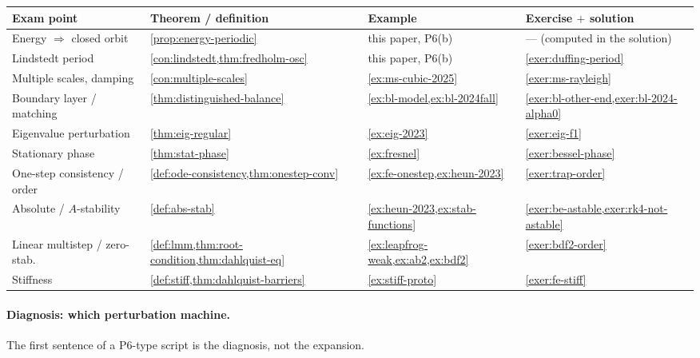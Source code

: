 \documentclass[11pt,a4paper]{article}
\begin{document}
{\footnotesize
\begin{center}
\begin{tabular}{@{}>{\raggedright\arraybackslash}p{3.3cm}
                   >{\raggedright\arraybackslash}p{3.7cm}
                   >{\raggedright\arraybackslash}p{3.5cm}
                   >{\raggedright\arraybackslash}p{3.5cm}@{}}
\toprule
Exam point & Theorem / definition & Example & Exercise \(+\) solution \\
\midrule
Energy \(\Rightarrow\) closed orbit & \cref{prop:energy-periodic} & this paper, P6(b) & --- (computed in the solution) \\
Lindstedt period & \cref{con:lindstedt,thm:fredholm-osc} & this paper, P6(b) & \cref{exer:duffing-period} \\
Multiple scales, damping & \cref{con:multiple-scales} & \cref{ex:ms-cubic-2025} & \cref{exer:ms-rayleigh} \\
Boundary layer / matching & \cref{thm:distinguished-balance} & \cref{ex:bl-model,ex:bl-2024fall} & \cref{exer:bl-other-end,exer:bl-2024-alpha0} \\
Eigenvalue perturbation & \cref{thm:eig-regular} & \cref{ex:eig-2023} & \cref{exer:eig-f1} \\
Stationary phase & \cref{thm:stat-phase} & \cref{ex:fresnel} & \cref{exer:bessel-phase} \\
One-step consistency / order & \cref{def:ode-consistency,thm:onestep-conv} & \cref{ex:fe-onestep,ex:heun-2023} & \cref{exer:trap-order} \\
Absolute / \(A\)-stability & \cref{def:abs-stab} & \cref{ex:heun-2023,ex:stab-functions} & \cref{exer:be-astable,exer:rk4-not-astable} \\
Linear multistep / zero-stab.\ & \cref{def:lmm,thm:root-condition,thm:dahlquist-eq} & \cref{ex:leapfrog-weak,ex:ab2,ex:bdf2} & \cref{exer:bdf2-order} \\
Stiffness & \cref{def:stiff,thm:dahlquist-barriers} & \cref{ex:stiff-proto} & \cref{exer:fe-stiff} \\
\bottomrule
\end{tabular}
\end{center}
}

\paragraph{Diagnosis: which perturbation machine.}

The first sentence of a P6-type script is the diagnosis, not the expansion.
\end{document}
